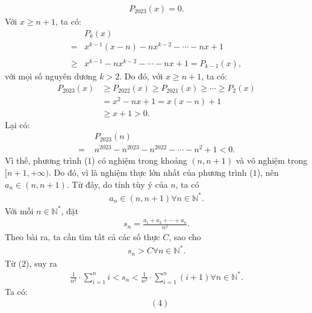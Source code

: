 \begin{multicols}{2}
\begin{align*}
		{P_{2023}}\left( x \right) = 0. \tag{$1$}
	\end{align*}
	Với $x \ge n + 1$, ta có:
	\begin{align*}
			&{P_k}\left( x \right) \\
			= &{x^{k - 1}}\left( {x - n} \right) - n{x^{k - 2}} -  \cdots  - nx + 1\\
			 \\
			\ge &{x^{k - 1}} - n{x^{k - 2}} -  \cdots  - nx + 1 = {P_{k - 1}}\left( x \right),
	\end{align*}
	với mọi số nguyên dương $k > 2$.
	\vskip 0.05cm
	Do đó, với $x \ge n + 1$, ta có:
	\begin{align*}
		{P_{2023}}\!\!\left( x \right) &\!\ge\! {P_{2022}}\!\!\left( x \right) \!\ge\! {P_{2021}}\!\!\left( x \right) \!\ge\!  \cdots  \!\ge\! {P_2}\!\!\left( x \right)\\
		& = {x^2} - nx + 1 = x\left( {x - n} \right) + 1\\
		&\ge x + 1 > 0.
	\end{align*}
	Lại có:
	\begin{align*}
		&{P_{2023}}\left( n \right) \\
		= \,\,&{n^{2023}} - {n^{2023}} - {n^{2022}} -  \cdots  - {n^2} + 1 < 0.
	\end{align*}
	Vì thế, phương trình ($1$) có nghiệm trong khoảng $(n, n + 1)$ và vô nghiệm trong $[n+ 1, + \infty)$.
	\vskip 0.05cm 
	Do đó, vì là nghiệm thực lớn nhất của phương trình ($1$), nên $a_n \in (n, n+1)$.
	\vskip 0.05cm  
	Từ đây, do tính tùy ý của $n$, ta có
	\begin{align*}
		{a_n} \in \left( {n,n + 1} \right)\forall n \in \mathbb{N^*}. \tag{$2$}
	\end{align*}
	Với mỗi $n \in \mathbb{N^*}$,  đặt
	\begin{align*}
		{s_n} = \frac{{{a_1} + {a_2} +  \cdots  + {a_n}}}{{{n^2}}}.
	\end{align*}
	Theo bài ra, ta cần tìm tất cả các số thực $C$, sao cho
	\begin{align*}
		{s_n} > C\forall n \in  \mathbb{N^*}. \tag{$3$}
	\end{align*}
	Từ ($2$), suy ra
	\begin{align*}
		\frac{1}{{{n^2}}} \cdot \sum\limits_{i = 1}^n i  < {s_n} < \frac{1}{{{n^2}}} \cdot \sum\limits_{i = 1}^n {\left( {i + 1} \right)} \forall n \in \mathbb{N^*}. \tag{$4$}
	\end{align*}
	Ta có:
	\begin{align*}
		&(4) \\

\end{align*}
\end{multicols}
